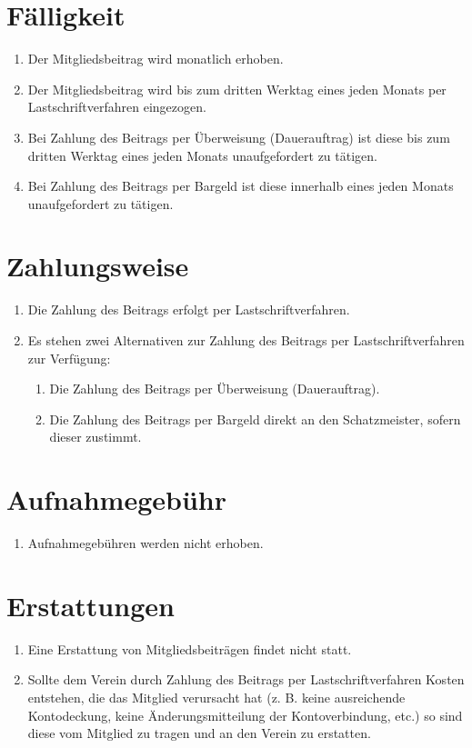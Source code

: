 \documentclass[a4paper, 12pt]{scrartcl}
\begin{document}
\section{Fälligkeit}
\begin{enumerate}
	\item Der Mitgliedsbeitrag wird monatlich erhoben.
	\item Der Mitgliedsbeitrag wird bis zum dritten Werktag eines jeden Monats per Lastschriftverfahren eingezogen.
	\item Bei Zahlung des Beitrags per Überweisung (Dauerauftrag) ist diese bis zum dritten Werktag eines jeden Monats unaufgefordert zu tätigen.
	\item Bei Zahlung des Beitrags per Bargeld ist diese innerhalb eines jeden Monats unaufgefordert zu tätigen.
\end{enumerate}

\section{Zahlungsweise}
\begin{enumerate}
	\item Die Zahlung des Beitrags erfolgt per Lastschriftverfahren.
	\item Es stehen zwei Alternativen zur Zahlung des Beitrags per Lastschriftverfahren zur Verfügung:
	\begin{enumerate}
    	\item Die Zahlung des Beitrags per Überweisung (Dauerauftrag).
        \item Die Zahlung des Beitrags per Bargeld direkt an den Schatzmeister, sofern dieser zustimmt.
    \end{enumerate}
\end{enumerate}

\section{Aufnahmegebühr}
\begin{enumerate}
	\item Aufnahmegebühren werden nicht erhoben.
\end{enumerate}

\section{Erstattungen}
\begin{enumerate}
	\item Eine Erstattung von Mitgliedsbeiträgen findet nicht statt.
	\item Sollte dem Verein durch Zahlung des Beitrags per Lastschriftverfahren Kosten entstehen, die das Mitglied verursacht hat (z. B. keine ausreichende Kontodeckung, keine Änderungsmitteilung der Kontoverbindung, etc.) so sind diese vom Mitglied zu tragen und an den Verein zu erstatten.
\end{enumerate}
\end{document}
